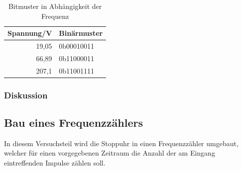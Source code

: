 \documentclass[12pt,a4paper]{article}
\begin{document}
\begin{table}[htbp]
\begin{center}
\begin{tabular}{|r|l|}
\hline
\multicolumn{1}{|l|}{Spannung/V} & Binärmuster \\ \hline \hline
19,05 & 0b00010011 \\ \hline
66,89 & 0b11000011 \\ \hline
207,1 & 0b11001111 \\ \hline
\end{tabular}
\end{center}
\caption{Bitmuster in Abhängigkeit der Frequenz}
\label{tab:span}
\end{table}



\subsubsection*{Diskussion}





\subsection{Bau eines Frequenzzählers}
In diesem Versuchsteil wird die Stoppuhr in einen Frequenzzähler umgebaut, welcher für einen vorgegebenen Zeitraum die Anzahl der am Eingang eintreffenden Impulse zählen soll.
\end{document}
